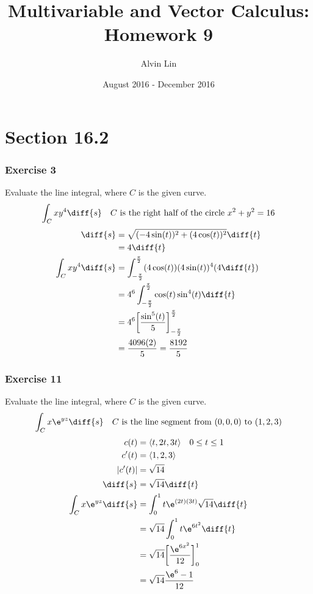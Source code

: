 \documentclass{math}
\title{Multivariable and Vector Calculus: Homework 9}
\author{Alvin Lin}
\date{August 2016 - December 2016}
\begin{document}
\maketitle

\section*{Section 16.2}

\subsubsection*{Exercise 3}
Evaluate the line integral, where \( C \) is the given curve.
\[ \int_{C}xy^4\diff{s} \quad C \text{ is the right half of the circle }
  x^2+y^2 = 16 \]
\begin{align*}
  \diff{s} &= \sqrt{(-4\sin(t))^2+(4\cos(t))^2}\diff{t} \\
  &= 4\diff{t} \\
  \int_{C}xy^4\diff{s} &= \int_{-\frac{\pi}{2}}^{\frac{\pi}{2}}
    (4\cos(t))(4\sin(t))^4(4\diff{t}) \\
  &= 4^6\int_{-\frac{\pi}{2}}^{\frac{\pi}{2}}\cos(t)\sin^4(t)\diff{t} \\
  &= 4^6\bigg[\frac{\sin^5(t)}{5}\bigg]_{-\frac{\pi}{2}}^{\frac{\pi}{2}} \\
  &= \frac{4096(2)}{5} = \frac{8192}{5}
\end{align*}

\subsubsection*{Exercise 11}
Evaluate the line integral, where \( C \) is the given curve.
\[ \int_{C}x\e^{yz}\diff{s} \quad C \text{ is the line segment from }
  (0,0,0) \text{ to } (1,2,3) \]
\begin{align*}
  c(t) &= \langle t,2t,3t\rangle \quad 0\le t\le 1 \\
  c'(t) &= \langle1,2,3\rangle \\
  |c'(t)| &= \sqrt{14} \\
  \diff{s} &= \sqrt{14}\diff{t} \\
  \int_{C}x\e^{yz}\diff{s} &= \int_{0}^{1}t\e^{(2t)(3t)}\sqrt{14}\diff{t} \\
  &= \sqrt{14}\int_{0}^{1}t\e^{6t^2}\diff{t} \\
  &= \sqrt{14}\bigg[\frac{\e^{6x^2}}{12}\bigg]_{0}^{1} \\
  &= \sqrt{14}\frac{\e^6-1}{12}
\end{align*}
\end{document}
